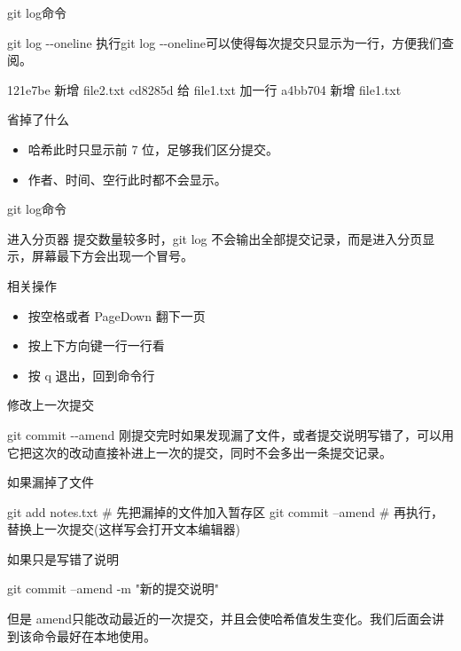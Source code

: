 \documentclass[aspectratio=169]{beamer}
\begin{document}
\begin{frame}[fragile]{git log命令}
	\begin{block}{git log -{}-oneline}
	执行git log -{}-oneline可以使得每次提交只显示为一行，方便我们查阅。
	\vspace{-0.8em}
		{
\begin{semiverbatim}
121e7be 新增 file2.txt
cd8285d 给 file1.txt 加一行
a4bb704 新增 file1.txt
\end{semiverbatim}
		}
	\end{block}
	\begin{block}{省掉了什么}
		\begin{itemize}
			\item 哈希此时只显示前 7 位，足够我们区分提交。
			\item 作者、时间、空行此时都不会显示。
		\end{itemize}
	\end{block}
\end{frame}

\begin{frame}{git log命令}
	\begin{block}{进入分页器}
		\hspace*{2em}提交数量较多时，git log 不会输出全部提交记录，而是进入分页显示，屏幕最下方会出现一个冒号。
	\end{block}
	\begin{block}{相关操作}
		\begin{itemize}
			\item 按空格或者 PageDown 翻下一页
			\item 按上下方向键一行一行看
			\item 按 q 退出，回到命令行
		\end{itemize}
	\end{block}
\end{frame}

\begin{frame}[fragile]{修改上一次提交}
	\begin{block}{git commit -{}-amend}
		\hspace*{2em}刚提交完时如果发现漏了文件，或者提交说明写错了，可以用它把这次的改动直接补进上一次的提交，同时不会多出一条提交记录。
	\end{block}
\begin{block}{如果漏掉了文件}
{
\begin{semiverbatim}
git add notes.txt      # 先把漏掉的文件加入暂存区
git commit --amend     # 再执行，替换上一次提交(这样写会打开文本编辑器)
\end{semiverbatim}
}
\end{block}
\begin{block}{如果只是写错了说明}
{
\begin{semiverbatim}
git commit --amend -m "新的提交说明"
\end{semiverbatim}
}
\end{block}

\begin{block}{但是}
	amend只能改动最近的一次提交，并且会使哈希值发生变化。我们后面会讲到该命令最好在本地使用。
\end{block}
\end{frame}
\end{document}
